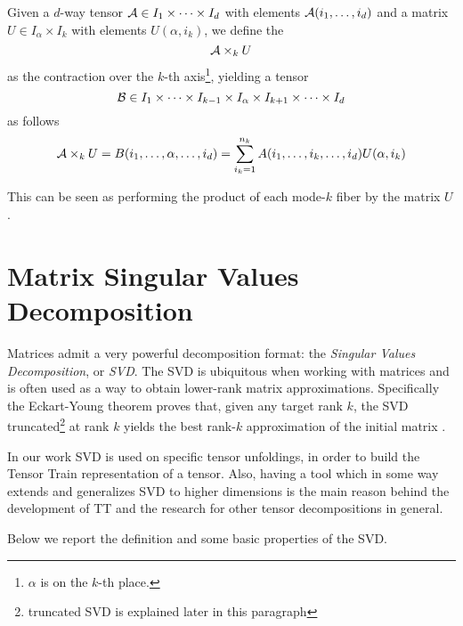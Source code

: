 \begin{Def} \label{def:tensor-matrix-product}
  Given a $d$-way tensor $\mathcal{A} \in I_1 \times \cdots \times I_d$ with elements $\mathcal{A}(i_1,\ldots,i_d)$ and a matrix $U \in I_\alpha \times I_k$ with elements $U(\alpha,i_k)$, we define the 
  \begin{equation*}
    \mathcal{A} \times_k U
  \end{equation*}
  as the contraction over the $k$-th axis\footnote{$\alpha$ is on the $k$-th place.}, yielding a tensor
  \begin{equation*}
    \mathcal{B} \in I_1 \times \cdots \times I_{k-1} \times I_\alpha \times I_{k+1} \times \cdots \times I_d
  \end{equation*}
  as follows
  \begin{equation*}
    \mathcal{A} \times_k U = B(i_1,\ldots,\alpha,\ldots,i_d) = \sum_{i_k = 1}^{n_k} A(i_1,\ldots,i_k,\ldots,i_d) U(\alpha,i_k)
  \end{equation*}
\end{Def}
This can be seen as performing the product of each mode-$k$ fiber by the matrix $U$.

\section{Matrix Singular Values Decomposition}
Matrices admit a very powerful decomposition format: the \emph{Singular Values Decomposition}, or \emph{SVD}. The SVD is ubiquitous when working with matrices and is often used as a way to obtain lower-rank matrix approximations. Specifically the Eckart-Young theorem proves that, given any target rank $k$, the SVD truncated\footnote{truncated SVD is explained later in this paragraph} at rank $k$ yields the best rank-$k$ approximation of the initial matrix \cite{SVDbestapprox}.

In our work SVD is used on specific tensor unfoldings, in order to build the Tensor Train representation of a tensor. Also, having a tool which in some way extends and generalizes SVD to higher dimensions is the main reason behind the development of TT and the research for other tensor decompositions in general.

Below we report the definition and some basic properties of the SVD.

